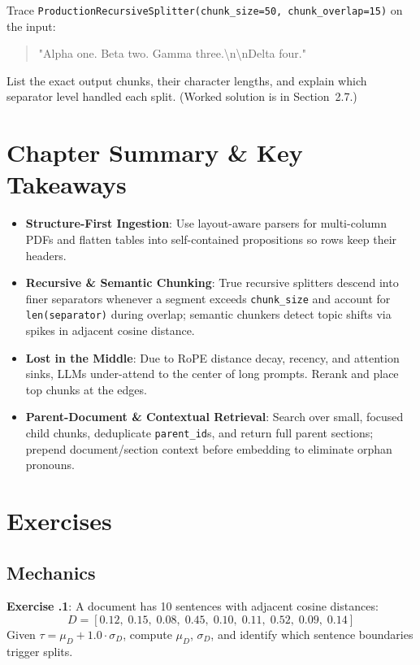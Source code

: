 \begin{tryityourselfbox}
Trace \texttt{ProductionRecursiveSplitter(chunk\_size=50, chunk\_overlap=15)} on the input:
\begin{quote}\small\ttfamily
"Alpha one. Beta two. Gamma three.\textbackslash n\textbackslash nDelta four."
\end{quote}
List the exact output chunks, their character lengths, and explain which separator level handled each split. (Worked solution is in Section~2.7.)
\end{tryityourselfbox}

\section{Chapter Summary \protect\& Key Takeaways}
\begin{itemize}[leftmargin=18pt]
  \item \textbf{Structure-First Ingestion}: Use layout-aware parsers for multi-column PDFs and flatten tables into self-contained propositions so rows keep their headers.
  \item \textbf{Recursive \& Semantic Chunking}: True recursive splitters descend into finer separators whenever a segment exceeds \texttt{chunk\_size} and account for \texttt{len(separator)} during overlap; semantic chunkers detect topic shifts via spikes in adjacent cosine distance.
  \item \textbf{Lost in the Middle}: Due to RoPE distance decay, recency, and attention sinks, LLMs under-attend to the center of long prompts. Rerank and place top chunks at the edges.
  \item \textbf{Parent-Document \& Contextual Retrieval}: Search over small, focused child chunks, deduplicate \texttt{parent\_id}s, and return full parent sections; prepend document/section context before embedding to eliminate orphan pronouns.
\end{itemize}

\section{Exercises}

\subsection*{Mechanics}
\textbf{Exercise \thechapter.1}: A document has 10 sentences with adjacent cosine distances:
\[
D = [0.12,\; 0.15,\; 0.08,\; 0.45,\; 0.10,\; 0.11,\; 0.52,\; 0.09,\; 0.14]
\]
Given $\tau = \mu_D + 1.0 \cdot \sigma_D$, compute $\mu_D$, $\sigma_D$, and identify which sentence boundaries trigger splits.

